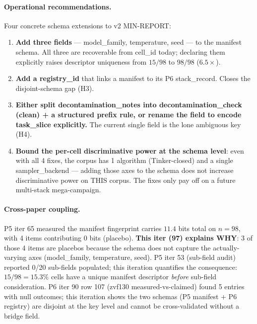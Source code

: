 \paragraph{Operational recommendations.}
Four concrete schema extensions to v2 MIN-REPORT:
\begin{enumerate}
\item \textbf{Add three fields} --- \textsf{model\_family},
\textsf{temperature}, \textsf{seed} --- to the manifest schema.
All three are recoverable from cell\_id today; declaring them
explicitly raises descriptor uniqueness from $15/98$ to $98/98$
($6.5\times$).
\item \textbf{Add a \textsf{registry\_id}} that links a manifest
to its P6 stack\_record. Closes the disjoint-schema gap (H3).
\item \textbf{Either split \textsf{decontamination\_notes} into
\textsf{decontamination\_check} (clean) + a structured prefix rule,
or rename the field to encode \textsf{task\_slice} explicitly.}
The current single field is the lone ambiguous key (H4).
\item \textbf{Bound the per-cell discriminative power at the schema
level}: even with all 4 fixes, the corpus has 1 algorithm
(Tinker-closed) and a single sampler\_backend --- adding those axes
to the schema does not increase discriminative power on THIS
corpus. The fixes only pay off on a future multi-stack
mega-campaign.
\end{enumerate}

\paragraph{Cross-paper coupling.}
P5 iter 65 measured the manifest fingerprint carries $11.4$ bits
total on $n{=}98$, with 4 items contributing 0 bits (placebo).
\textbf{This iter (97) explains WHY}: 3 of those 4 items are
placebos because the schema does not capture the actually-varying
axes (\textsf{model\_family, temperature, seed}). P5 iter 53
(sub-field audit) reported 0/20 sub-fields populated; this iteration
quantifies the consequence: $15/98 = 15.3\%$ cells have a unique
manifest descriptor \emph{before} sub-field consideration. P6 iter
90 row 107 (zvf130 measured-vs-claimed) found 5 entries with null
outcomes; this iteration shows the two schemas (P5 manifest + P6
registry) are disjoint at the key level and cannot be
cross-validated without a bridge field.
